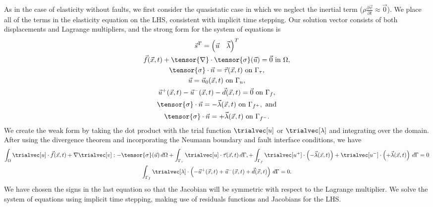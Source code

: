 As in the case of elasticity without faults, we first consider the
quasistatic case in which we neglect the inertial term
($\rho \frac{\partial \vec{v}}{\partial t} \approx \vec{0}$). We place
all of the terms in the elasticity equation on the LHS, consistent
with implicit time stepping. Our solution vector consists of both
displacements and Lagrange multipliers, and the strong form for the
system of equations is
\begin{gather}
  \vec{s}^T = \left( \vec{u} \quad \vec{\lambda} \right)^T \\
  \vec{f}(\vec{x},t) + \tensor{\nabla} \cdot \tensor{\sigma}(\vec{u}) = \vec{0} \text{ in }\Omega, \\
  \tensor{\sigma} \cdot \vec{n} = \vec{\tau}(\vec{x},t) \text{ on }\Gamma_\tau, \\
  \vec{u} = \vec{u}_0(\vec{x},t) \text{ on }\Gamma_u, \\
  \vec{u}^+(\vec{x},t) - \vec{u}^-(\vec{x},t) - \vec{d}(\vec{x},t) = \vec{0} \text{ on }\Gamma_f,  \\
  \tensor{\sigma} \cdot \vec{n} = -\vec{\lambda}(\vec{x},t) \text{ on }\Gamma_{f^+}, \text{ and}\\
  \tensor{\sigma} \cdot \vec{n} = +\vec{\lambda}(\vec{x},t) \text{ on }\Gamma_{f^-}.
\end{gather}
We create the weak form by taking the dot product with the trial
function $\trialvec[u]$ or $\trialvec[\lambda]$ and integrating over
the domain. After using the divergence theorem and incorporating the
Neumann boundary and fault interface conditions, we have
\begin{gather}
  \int_\Omega \trialvec[u] \cdot \vec{f}(\vec{x},t) + \nabla \trialvec[v] : -\tensor{\sigma}(\vec{u}) \, d\Omega
  + \int_{\Gamma_\tau} \trialvec[u] \cdot \vec{\tau}(\vec{x},t) \, d\Gamma,
  + \int_{\Gamma_{f}} \trialvec[u^+] \cdot \left(-\vec{\lambda}(\vec{x},t)\right)
  + \trialvec[u^-] \cdot \left(+\vec{\lambda}(\vec{x},t)\right)\, d\Gamma = 0\\
  \int_{\Gamma_{f}} \trialvec[\lambda] \cdot \left(
    -\vec{u}^+(\vec{x},t) + \vec{u}^-(\vec{x},t) + \vec{d}(\vec{x},t) \right) \, d\Gamma = 0.
\end{gather}
We have chosen the signs in the last equation so that the Jacobian
will be symmetric with respect to the Lagrange multiplier. We solve
the system of equations using implicit time stepping, making use of
residuals functions and Jacobians for the LHS.


